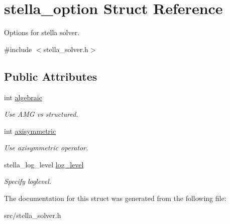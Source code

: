 \hypertarget{structstella__option}{}\section{stella\+\_\+option Struct Reference}
\label{structstella__option}


Options for stella solver.  




{\ttfamily \#include $<$stella\+\_\+solver.\+h$>$}

\subsection*{Public Attributes}
\begin{DoxyCompactItemize}
\item 
\mbox{\label{structstella__option_a7f75f868c31961c970a0013eb119ce53}} 
int \mbox{\hyperlink{structstella__option_a7f75f868c31961c970a0013eb119ce53}{algebraic}}
\begin{DoxyCompactList}\small\item\em Use A\+MG vs structured. \end{DoxyCompactList}\item 
\mbox{\label{structstella__option_af39b798655aad250875e43e1158e0d8b}} 
int \mbox{\hyperlink{structstella__option_af39b798655aad250875e43e1158e0d8b}{axisymmetric}}
\begin{DoxyCompactList}\small\item\em Use axisymmetric operator. \end{DoxyCompactList}\item 
\mbox{\label{structstella__option_a353548174d60832887cd03f7b586936a}} 
stella\+\_\+log\+\_\+level \mbox{\hyperlink{structstella__option_a353548174d60832887cd03f7b586936a}{log\+\_\+level}}
\begin{DoxyCompactList}\small\item\em Specify loglevel. \end{DoxyCompactList}\end{DoxyCompactItemize}


The documentation for this struct was generated from the following file\+:\begin{DoxyCompactItemize}
\item 
src/stella\+\_\+solver.\+h\end{DoxyCompactItemize}
